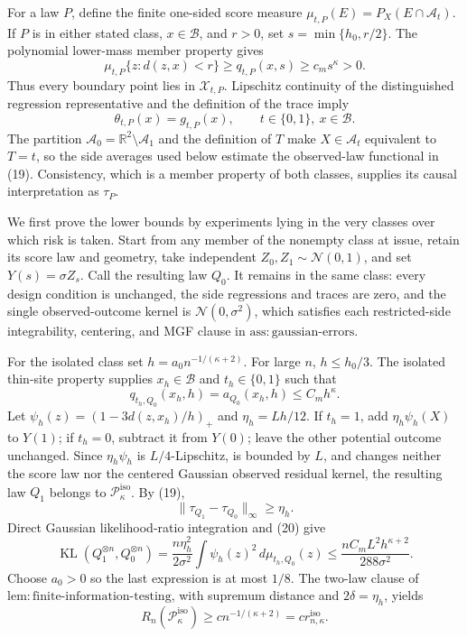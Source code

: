 For a law \(P\), define the finite one-sided score measure \(\mu_{t,P}(E)=P_X(E\cap\mathcal A_t)\). If \(P\) is in either stated class, \(x\in\mathcal B\), and \(r>0\), set \(s=\min\{h_0,r/2\}\). The polynomial lower-mass member property gives
\[
 \mu_{t,P}\{z:d(z,x)<r\}\ge q_{t,P}(x,s)\ge c_ms^\kappa>0. \tag{18}
\]
Thus every boundary point lies in \(\mathcal X_{t,P}\). Lipschitz continuity of the distinguished regression representative and the definition of the trace imply
\[
 \theta_{t,P}(x)=g_{t,P}(x),\qquad t\in\{0,1\},\ x\in\mathcal B. \tag{19}
\]
The partition \(\mathcal A_0=\mathbb R^2\setminus\mathcal A_1\) and the definition of \(T\) make \(X\in\mathcal A_t\) equivalent to \(T=t\), so the side averages used below estimate the observed-law functional in (19). Consistency, which is a member property of both classes, supplies its causal interpretation as \(\tau_P\).

We first prove the lower bounds by experiments lying in the very classes over which risk is taken. Start from any member of the nonempty class at issue, retain its score law and geometry, take independent \(Z_0,Z_1\sim\mathcal N(0,1)\), and set \(Y(s)=\sigma Z_s\). Call the resulting law \(Q_0\). It remains in the same class: every design condition is unchanged, the side regressions and traces are zero, and the single observed-outcome kernel is \(\mathcal N(0,\sigma^2)\), which satisfies each restricted-side integrability, centering, and MGF clause in \(\mathrm{ass:gaussian\text{-}errors}\).

For the isolated class set \(h=a_0n^{-1/(\kappa+2)}\). For large \(n\), \(h\le h_0/3\). The isolated thin-site property supplies \(x_h\in\mathcal B\) and \(t_h\in\{0,1\}\) such that
\[
 q_{t_h,Q_0}(x_h,h)=a_{Q_0}(x_h,h)\le C_mh^\kappa. \tag{20}
\]
Let \(\psi_h(z)=(1-3d(z,x_h)/h)_+\) and \(\eta_h=Lh/12\). If \(t_h=1\), add \(\eta_h\psi_h(X)\) to \(Y(1)\); if \(t_h=0\), subtract it from \(Y(0)\); leave the other potential outcome unchanged. Since \(\eta_h\psi_h\) is \(L/4\)-Lipschitz, is bounded by \(L\), and changes neither the score law nor the centered Gaussian observed residual kernel, the resulting law \(Q_1\) belongs to \(\mathcal P_\kappa^{\mathrm{iso}}\). By (19),
\[
 \|\tau_{Q_1}-\tau_{Q_0}\|_\infty\ge\eta_h. \tag{21}
\]
Direct Gaussian likelihood-ratio integration and (20) give
\[
 \operatorname{KL}(Q_1^{\otimes n},Q_0^{\otimes n})
 =\frac{n\eta_h^2}{2\sigma^2}\int\psi_h(z)^2\,d\mu_{t_h,Q_0}(z)
 \le \frac{nC_mL^2h^{\kappa+2}}{288\sigma^2}. \tag{22}
\]
Choose \(a_0>0\) so the last expression is at most \(1/8\). The two-law clause of \(\mathrm{lem:finite\text{-}information\text{-}testing}\), with supremum distance and \(2\delta=\eta_h\), yields
\[
 R_n(\mathcal P_\kappa^{\mathrm{iso}})\ge c n^{-1/(\kappa+2)}=c r_{n,\kappa}^{\mathrm{iso}}. \tag{23}
\]


